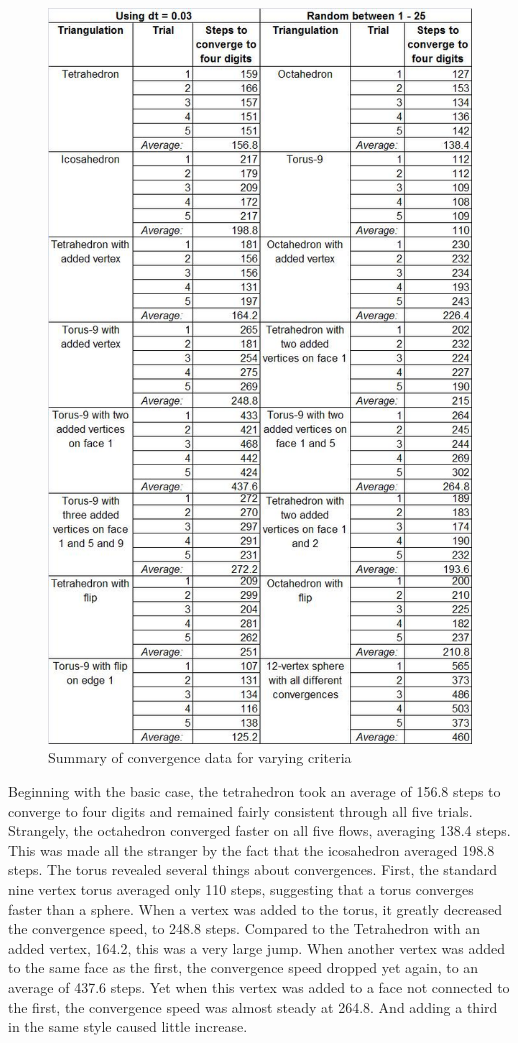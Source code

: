 \documentclass[12pt]{article}
\begin{document}
\begin{figure}
\centering
\includegraphics[scale = 0.7]{Pictures3/ConvergenceTable.png}
\caption{Summary of convergence data for varying criteria}
\label{fig:conv}
\end{figure}

 Beginning with the basic case, the tetrahedron took an average of 156.8 steps to converge to four digits and remained fairly consistent through all five trials. Strangely, the octahedron converged faster on all five flows, averaging 138.4 steps. This was made all the stranger by the fact that the icosahedron averaged 198.8 steps. The torus revealed several things about convergences. First, the standard nine vertex torus averaged only 110 steps, suggesting that a torus converges faster than a sphere. When a vertex was added to the torus, it greatly decreased the convergence speed, to 248.8 steps. Compared to the Tetrahedron with an added vertex, 164.2, this was a very large jump. When another vertex was added to the same face as the first, the convergence speed dropped yet again, to an average of 437.6 steps. Yet when this vertex was added to a face not connected to the first, the convergence speed was almost steady at 264.8. And adding a third in the same style caused little
  increase.
\end{document}
